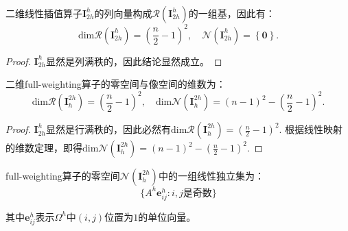 \documentclass[lang=cn,10pt]{elegantbook}
\begin{document}
\begin{lemma}
  二维线性插值算子$\mathbf{I}^h_{2h}$的列向量构成$\mathcal{R}(\mathbf{I}^h_{2h})$的一组基，因此有：
  \begin{equation}
    \text{dim} \mathcal{R}(\mathbf{I}^h_{2h}) = \left(\frac{n}{2}-1\right)^2,\quad \mathcal{N}(\mathbf{I}^h_{2h})=\left\{\mathbf{0}\right\}.
  \end{equation}
\end{lemma}

\begin{proof}
  $\mathbf{I}^h_{2h}$显然是列满秩的，因此结论显然成立。
\end{proof}

\begin{lemma}
  二维full-weighting算子的零空间与像空间的维数为：
  \begin{equation}
    \text{dim} \mathcal{R}(\mathbf{I}^{2h}_{h}) = \left(\frac{n}{2}-1\right)^2,\quad \text{dim} \mathcal{N}(\mathbf{I}^{2h}_{h})=(n-1)^2-\left(\frac{n}{2}-1\right)^2.
  \end{equation}
\end{lemma}

\begin{proof}
  $\mathbf{I}^h_{2h}$显然是行满秩的，因此必然有$\text{dim} \mathcal{R}(\mathbf{I}^{2h}_{h}) = \left(\frac{n}{2}-1\right)^2$. 根据线性映射的维数定理，即得$\text{dim} \mathcal{N}(\mathbf{I}^{2h}_{h})=(n-1)^2-\left(\frac{n}{2}-1\right)^2$.
\end{proof}

\begin{lemma}
  full-weighting算子的零空间$\mathcal{N}(\mathbf{I}^{2h}_{h})$中的一组线性独立集为：
  \begin{equation}
    \{A^h\mathbf{e}^h_{ij}:i,j\text{是奇数}\}
  \end{equation}

  其中$\mathbf{e}^h_{ij}$表示$\Omega^h$中$(i,j)$位置为$1$的单位向量。
\end{lemma}
\end{document}
